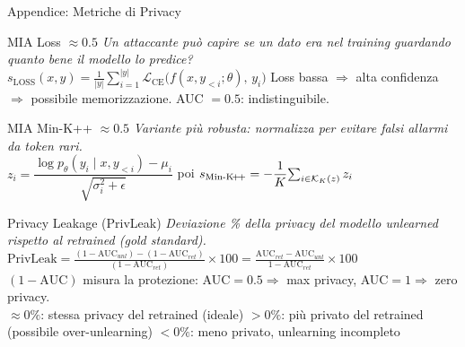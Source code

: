 \documentclass[aspectratio=169,11pt]{beamer}
\begin{document}
\begin{frame}{Appendice: Metriche di Privacy}
  \vspace{-0.8em}
    \tiny
  \begin{block}{\tiny MIA Loss $\approx 0.5$}
    \textit{Un attaccante pu\`o capire se un dato era nel training guardando quanto bene il modello lo predice?}\\[0.2em]
    $s_{\text{LOSS}}(x, y) = \frac{1}{|y|} \sum_{i=1}^{|y|}
    \mathcal{L}_{\text{CE}}\!\bigl(f(x, y_{<i}; \theta),\, y_i\bigr)$
    \hfill Loss bassa $\Rightarrow$ alta confidenza $\Rightarrow$ possibile memorizzazione. AUC $= 0.5$: indistinguibile.
  \end{block}
  \vspace{-0.8em}
  \begin{block}{\tiny MIA Min-K++ $\approx 0.5$}
    \textit{Variante pi\`u robusta: normalizza per evitare falsi allarmi da token rari.}\\[0.2em]
    $z_i = \dfrac{\log p_\theta(y_i \mid x, y_{<i}) - \mu_i}{\sqrt{\sigma_i^2 + \epsilon}}$
    \quad poi \quad
    $s_{\text{Min-K\!+\!+}} = -\dfrac{1}{K}\!\sum_{i \in \mathcal{K}_K(z)} z_i$
  \end{block}
  \vspace{-0.8em}
  \begin{block}{\tiny Privacy Leakage (PrivLeak)}
    \textit{Deviazione \% della privacy del modello unlearned rispetto al retrained (gold standard).}\\[0.2em]
    $\mathrm{PrivLeak} =
    \frac{(1 - \mathrm{AUC}_{unl}) - (1 - \mathrm{AUC}_{ret})}
         {(1 - \mathrm{AUC}_{ret})} \times 100
    = \frac{\mathrm{AUC}_{ret} - \mathrm{AUC}_{unl}}
           {1 - \mathrm{AUC}_{ret}} \times 100$\\[0.2em]
    $(1\!-\!\mathrm{AUC})$ misura la protezione: AUC$=0.5 \Rightarrow$ max privacy, AUC$=1 \Rightarrow$ zero privacy.\\[0.1em]
    $\approx 0\%$: stessa privacy del retrained (ideale) \quad
    $> 0\%$: pi\`u privato del retrained (possibile over-unlearning) \quad
    $< 0\%$: meno privato, unlearning incompleto
  \end{block}
\end{frame}
\end{document}
